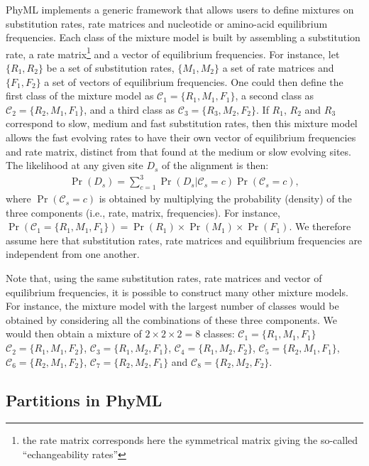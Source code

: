 \documentclass[a4paper,12pt]{article}
\begin{document}
PhyML implements  a generic framework  that allows users  to define mixtures on  substitution rates,
rate matrices and nucleotide or amino-acid  equilibrium frequencies. Each class of the mixture model
is built by assembling a substitution  rate, a rate matrix\footnote{the rate matrix corresponds here
the symmetrical  matrix giving the so-called  ``echangeability rates''} and a  vector of equilibrium
frequencies.  For instance, let $\{R_1,R_2\}$ be a set of substitution rates, $\{M_1,M_2\}$ a set of
rate matrices and $\{F_1,F_2\}$ a set of  vectors of equilibrium frequencies.  One could then define
the  first class  of the  mixture model  as  $\mathcal{C}_1 =  \{R_1,M_1,F_1\}$, a  second class  as
$\mathcal{C}_2  = \{R_2,M_1,F_1\}$,  and a  third class  as $\mathcal{C}_3  =  \{R_3,M_2,F_2\}$.  If
$R_1$, $R_2$  and $R_3$ correspond to  slow, medium and  fast substitution rates, then  this mixture
model allows the  fast evolving rates to have  their own vector of equilibrium  frequencies and rate
matrix, distinct from that  found at the medium or slow evolving sites.  The likelihood at any given
site $D_s$ of the alignment is then:
\begin{eqnarray}\label{equ:mixtlk}
\Pr(D_s) = \sum_{c=1}^{3} \Pr(D_s | \mathcal{C}_s=c) \Pr(\mathcal{C}_s=c),
\end{eqnarray}
where  $\Pr(\mathcal{C}_s=c)$ is  obtained by  multiplying the  probability (density)  of  the three
components (i.e., rate, matrix, frequencies). For instance, $\Pr(\mathcal{C}_1=\{R_1,M_1,F_1\}) =
 \Pr(R_1)\times \Pr(M_1) \times \Pr(F_1)$.
We therefore assume here that substitution rates, rate
matrices and equilibrium frequencies are independent from one another.

Note that, using the  same substitution rates, rate matrices and  vector of equilibrium frequencies,
it is  possible to construct  many other mixture  models. For instance,  the mixture model  with the
largest number of classes would be obtained by considering all the combinations of these three components. We
would then  obtain a  mixture of $2\times  2 \times 2=8$  classes: $\mathcal{C}_1  = \{R_1,M_1,F_1\}$
$\mathcal{C}_2   =   \{R_1,M_1,F_2\}$,   $\mathcal{C}_3   =   \{R_1,M_2,F_1\}$,   $\mathcal{C}_4   =
\{R_1,M_2,F_2\}$,   $\mathcal{C}_5   =    \{R_2,M_1,F_1\}$,   $\mathcal{C}_6   =   \{R_2,M_1,F_2\}$,
$\mathcal{C}_7 = \{R_2,M_2,F_1\}$ and $\mathcal{C}_8 = \{R_2,M_2,F_2\}$.
 

\subsection{Partitions in PhyML}
\end{document}
